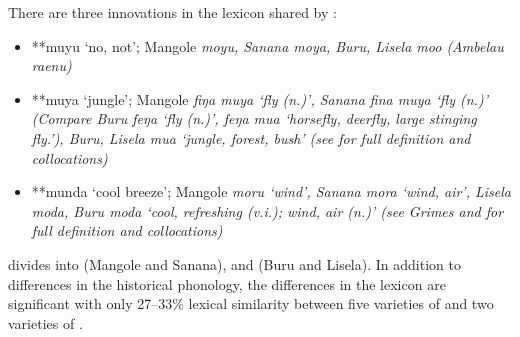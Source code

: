There are three innovations in the lexicon shared by :

\begin{itemize}[noitemsep]
	\item	**muyu ‘no,
				not’; Mangole \it{moyu,} Sanana \it{moya},
				Buru, Lisela \it{moo} (Ambelau \it{raenu})
	\item	**muya ‘jungle’; Mangole \it{fiŋa muya} ‘fly (n.)’,
				Sanana \it{fina muya} ‘fly (n.)’ (Compare Buru \it{feŋa} ‘fly
				(n.)’, \it{feŋa mua} ‘horsefly, deerfly,
				large stinging fly.’), Buru,
				Lisela \it{mua} ‘jungle, forest,
				bush’ (see \citet[633f]{GrimesGrimes2020} for full definition
				and collocations) 
	\item	**munda ‘cool breeze’; Mangole \it{moru} ‘wind’,
				Sanana \it{mora} ‘wind, air’,
				Lisela \it{moda,} Buru \it{moda} ‘cool,
				refreshing (v.i.); wind, air (n.)’ (see Grimes
				and \citet[625f]{GrimesGrimes2020} for full definition
				and collocations) 
\end{itemize}

 divides into  (Mangole
and Sanana), and  (Buru and Lisela).
In addition to differences in the historical phonology,
the differences in the lexicon are significant with only 27--33{\%}
lexical similarity between five varieties of 
and two varieties of  \citep{Grimes2000a}.

